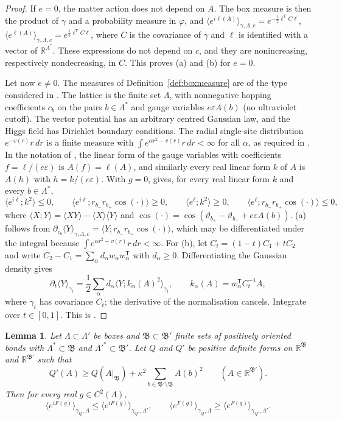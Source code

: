 \documentclass[11pt]{amsart}
\theoremstyle{plain}
\newtheorem{lemma}[theorem]{Lemma}
\theoremstyle{definition}
\theoremstyle{remark}
\numberwithin{equation}{section}
\newcommand{\R}{\mathbb{R}}
\newcommand{\eps}{\varepsilon}
\newcommand{\fB}{\mathfrak{B}}
\newcommand{\ev}[1]{\langle #1\rangle}
\begin{document}
\begin{proof}
If $e=0$, the matter action does not depend on $A$. The box measure is then the product of $\gamma$ and a probability measure in $\varphi$, and $\ev{e^{i\ell(A)}}_{\gamma,\Lambda,c}=e^{-\frac12\ell^{\mathsf T}C\ell}$, $\ev{e^{\ell(A)}}_{\gamma,\Lambda,c}=e^{\frac12\ell^{\mathsf T}C\ell}$, where $C$ is the covariance of $\gamma$ and $\ell$ is identified with a vector of $\R^{\Lambda^*}$. These expressions do not depend on $c$, and they are nonincreasing, respectively nondecreasing, in $C$. This proves (a) and (b) for $e=0$.

Let now $e\ne0$. The measures of Definition~\ref{def:boxmeasure} are of the type considered in \cite[Sect.~6.1, pp.~275--276]{BFS1}. The lattice is the finite set $\Lambda$, with nonnegative hopping coefficients $c_b$ on the pairs $b\in\Lambda^*$ and gauge variables $e\eps A(b)$ (no ultraviolet cutoff). The vector potential has an arbitrary centred Gaussian law, and the Higgs field has Dirichlet boundary conditions. The radial single-site distribution $e^{-v(r)}r\,dr$ is a finite measure with $\int e^{\alpha r^2-v(r)}r\,dr<\infty$ for all $\alpha$, as required in \cite[Sect.~4.1, p.~262]{BFS1}. In the notation of \cite[Sect.~6.3]{BFS1}, the linear form of the gauge variables with coefficients $f=\ell/(e\eps)$ is $A(f)=\ell(A)$, and similarly every real linear form $k$ of $A$ is $A(h)$ with $h=k/(e\eps)$. With $g=0$, \cite[Thm.~6.2, p.~280]{BFS1} gives, for every real linear form $k$ and every $b\in\Lambda^*$,
\[
\ev{e^{i\ell};k^2}\le0,\qquad\ev{e^{i\ell};r_{b_-}r_{b_+}\cos(\cdot)}\ge0,\qquad\ev{e^{\ell};k^2}\ge0,\qquad\ev{e^{\ell};r_{b_-}r_{b_+}\cos(\cdot)}\le0,
\]
where $\ev{X;Y}=\ev{XY}-\ev X\ev Y$ and $\cos(\cdot)=\cos(\vartheta_{b_+}-\vartheta_{b_-}+e\eps A(b))$. (a) follows from $\partial_{c_b}\ev Y_{\gamma,\Lambda,c}=\ev{Y;r_{b_-}r_{b_+}\cos(\cdot)}$, which may be differentiated under the integral because $\int e^{\alpha r^2-v(r)}r\,dr<\infty$. For (b), let $C_t=(1-t)C_1+tC_2$ and write $C_2-C_1=\sum_\alpha d_\alpha w_\alpha w_\alpha^{\mathsf T}$ with $d_\alpha\ge0$. Differentiating the Gaussian density gives
\[
\partial_t\ev Y_{\gamma_{t}}=\frac12\sum_\alpha d_\alpha\ev{Y;k_\alpha(A)^2}_{\gamma_t},\qquad k_\alpha(A)=w_\alpha^{\mathsf T}C_t^{-1}A ,
\]
where $\gamma_t$ has covariance $C_t$; the derivative of the normalisation cancels. Integrate over $t\in[0,1]$. This is \cite[Cor.~6.3(1), p.~281]{BFS1}.
\end{proof}

\begin{lemma}\label{lem:compare}
Let $\Lambda\subset\Lambda'$ be boxes and $\fB\subset\fB'$ finite sets of positively oriented bonds with $\Lambda^*\subset\fB$ and $\Lambda'^*\subset\fB'$. Let $Q$ and $Q'$ be positive definite forms on $\R^\fB$ and $\R^{\fB'}$ such that
\begin{equation}\label{eq:compare}
Q'(A)\ge Q(A|_\fB)+\kappa^2\sum_{b\in\fB'\setminus\fB}A(b)^2\qquad(A\in\R^{\fB'}).
\end{equation}
Then for every real $g\in C^2(\Lambda)$,
\[
\ev{e^{iF(g)}}_{\gamma_Q,\Lambda}\le\ev{e^{iF(g)}}_{\gamma_{Q'},\Lambda'},\qquad\ev{e^{F(g)}}_{\gamma_Q,\Lambda}\ge\ev{e^{F(g)}}_{\gamma_{Q'},\Lambda'} .
\]
\end{lemma}
\end{document}
